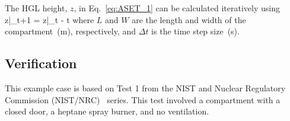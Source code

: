 The HGL height, $z$, in Eq.~\ref{eq:ASET_1} can be calculated iteratively using
\be
z|_{t+1} = z|_t -  \Delta t
\label{eq:ASET_5}
\ee
where $L$ and $W$ are the length and width of the compartment~(\si{m}), respectively, and $\Delta t$ is the time step size~(\si{s}).


\clearpage


\subsection*{Verification}

This example case is based on Test 1 from the NIST and Nuclear Regulatory Commission (NIST/NRC)~\cite{Hamins:SP1013-1} series. This test involved a compartment with a closed door, a heptane spray burner, and no ventilation.

